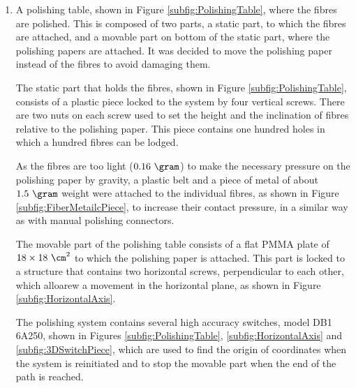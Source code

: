 \begin{enumerate}
\item{} A polishing table, shown in Figure \ref{subfig:PolishingTable}, where the fibres are polished. This is composed of two parts, a static part, to which the fibres are attached, and a movable part on bottom of the static part, where the polishing papers are attached. It was decided to move the polishing paper instead of the fibres to avoid damaging them.

The static part that holds the fibres, shown in Figure \ref{subfig:PolishingTable}, consists of a plastic piece locked to the system by four vertical screws. There are two nuts on each screw used to set the height and the inclination of fibres relative to the polishing paper. This piece contains one hundred holes in which a hundred fibres can be lodged. 

As the fibres are too light ($0.16~\gram$) to make the necessary pressure on the polishing paper by gravity, a plastic belt and a piece of metal of about $1.5~\gram$ weight were attached to the individual fibres, as shown in Figure \ref{subfig:FiberMetailcPiece}, to increase their contact pressure, in a similar way as with manual polishing connectors. 

The movable part of the polishing table consists of a flat PMMA plate of $18 \times 18~\cm^2$ to which the polishing paper is attached. This part is locked to a structure \cite{StructureAxis} that contains two horizontal screws, perpendicular to each other, which alloarew a movement in the horizontal plane, as shown in Figure \ref{subfig:HorizontalAxis}.

The polishing system contains several high accuracy switches, model DB1 6A250, shown in Figures \ref{subfig:PolishingTable}, \ref{subfig:HorizontalAxis} and \ref{subfig:3DSwitchPiece}, which are used to find the origin of coordinates when the system is reinitiated and to stop the movable part when the end of the path is reached. 


\end{enumerate}
